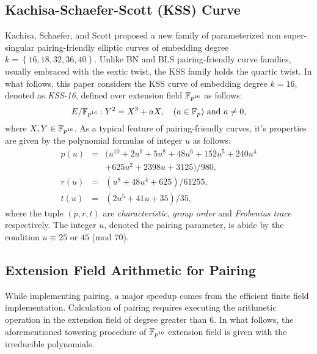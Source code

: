 \subsection{Kachisa-Schaefer-Scott (KSS) Curve \cite{EPRINT:KacSchSco07}}
Kachisa, Schaefer, and Scott proposed a new family of  parameterized non super-singular pairing-friendly elliptic curves of embedding degree $k = \left\lbrace 16, 18, 32, 36, 40\right\rbrace$.
Unlike BN and BLS pairing-friendly curve families, usually embraced with the sextic twist, the KSS family  holds the quartic twist. 
In what follows, this paper considers  the KSS curve of embedding degree $k =16$, denoted as \textit{KSS-16}, defined over extension field $\mathbb{F}_{p^{16}}$ as follows:
\begin{equation}\label{eq:KSS_16}
E/\mathbb{F}_{p^{16}}:Y^2=X^3+aX, \quad \mbox{($a \in {\mathbb{F}}_{p}$) and  $a \neq 0$},
\end{equation}
where $X,Y \in \mathbb{F}_{p^{16}}$. 
As a typical feature of pairing-friendly curves, it's properties are given by the polynomial formulas of integer $u$ as follows:
\begin{subequations}
	\begin{eqnarray}
	p(u) &= & (u^{10} +2u^9 +5u^8 +48u^6 +152u^5 +240u^4   \nonumber \\ 
	&& +625u^2 +2398u +3125)/980,  \\\label{eq:kss_16_char}
	r(u) &= & (u^8 +48u^4 +625)/61255, \label{eq:kss_16_degree}  \\
	t(u) &=& (2u^5 +41u+35)/35, \label{eq:kss_16_trace} 
	\end{eqnarray}
\end{subequations} 
where the tuple $(p,r,t)$ are \textit{characteristic}, \textit{group order} and \textit{Frobenius trace} respectively.
The integer  $u$, denoted the pairing parameter, is abide by the condition $u \equiv 25$ or $45$ (mod $70$). 

\subsection{Extension Field Arithmetic for Pairing}
While implementing pairing, a major speedup comes from the efficient finite field implementation. 
Calculation of pairing requires executing the arithmetic operation in the extension field {of degree greater than 6}\cite{EPRINT:BenSco09}.
In what follows, the aforementioned towering procedure of  $\mathbb{F}_{p^{16}}$ extension field is given with the irreducible polynomials.


